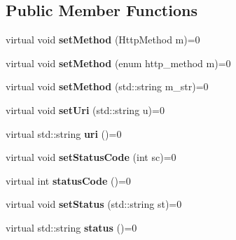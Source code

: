 \subsection*{Public Member Functions}
\begin{DoxyCompactItemize}
\item 
\mbox{\label{class_message_interface_aac5de86a7423b061331f4477cdb65e45}} 
virtual void {\bfseries set\+Method} (Http\+Method m)=0
\item 
\mbox{\label{class_message_interface_ac22f61b2a5fbc003b84b135549719101}} 
virtual void {\bfseries set\+Method} (enum http\+\_\+method m)=0
\item 
\mbox{\label{class_message_interface_a7c81d00f403337a3064881db3b9716e6}} 
virtual void {\bfseries set\+Method} (std\+::string m\+\_\+str)=0
\item 
\mbox{\label{class_message_interface_a06a16fde4d02ffdbf217ef010751bc66}} 
virtual void {\bfseries set\+Uri} (std\+::string u)=0
\item 
\mbox{\label{class_message_interface_a5f0e88434038d9af88e7a58ea31c9890}} 
virtual std\+::string {\bfseries uri} ()=0
\item 
\mbox{\label{class_message_interface_a378747430b897ae346c278c321c3a9c3}} 
virtual void {\bfseries set\+Status\+Code} (int sc)=0
\item 
\mbox{\label{class_message_interface_ab3e8305b0795bfc372ad4767f46dce58}} 
virtual int {\bfseries status\+Code} ()=0
\item 
\mbox{\label{class_message_interface_accb5e2e87727e18ca3f244de4bf32f75}} 
virtual void {\bfseries set\+Status} (std\+::string st)=0
\item 
\mbox{\label{class_message_interface_a9497e1e1eb81cd527fb546a3dc5f2e30}} 
virtual std\+::string {\bfseries status} ()=0
\item 
\mbox{\label{class_message_interface_a5926ad8da3b7b2613ea186e2e1e2cbf7}} 

\end{DoxyCompactItemize}
